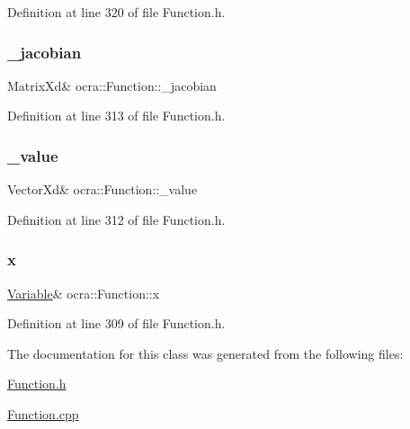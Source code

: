 Definition at line 320 of file Function.\+h.

\hypertarget{classocra_1_1Function_ade18c5f3f678fe0245dfc397e99112dc}{}\label{classocra_1_1Function_ade18c5f3f678fe0245dfc397e99112dc} 
\subsubsection{\texorpdfstring{\+\_\+jacobian}{\_jacobian}}
{\footnotesize\ttfamily Matrix\+Xd\& ocra\+::\+Function\+::\+\_\+jacobian\hspace{0.3cm}{\ttfamily [protected]}}



Definition at line 313 of file Function.\+h.

\hypertarget{classocra_1_1Function_adf9ae8a4ca631a787c99c4b499bea094}{}\label{classocra_1_1Function_adf9ae8a4ca631a787c99c4b499bea094} 
\subsubsection{\texorpdfstring{\+\_\+value}{\_value}}
{\footnotesize\ttfamily Vector\+Xd\& ocra\+::\+Function\+::\+\_\+value\hspace{0.3cm}{\ttfamily [protected]}}



Definition at line 312 of file Function.\+h.

\hypertarget{classocra_1_1Function_a28825886d1f149c87b112ec2ec1dd486}{}\label{classocra_1_1Function_a28825886d1f149c87b112ec2ec1dd486} 
\subsubsection{\texorpdfstring{x}{x}}
{\footnotesize\ttfamily \hyperlink{classocra_1_1Variable}{Variable}\& ocra\+::\+Function\+::x\hspace{0.3cm}{\ttfamily [protected]}}



Definition at line 309 of file Function.\+h.



The documentation for this class was generated from the following files\+:\begin{DoxyCompactItemize}
\item 
\hyperlink{Function_8h}{Function.\+h}\item 
\hyperlink{Function_8cpp}{Function.\+cpp}\end{DoxyCompactItemize}
